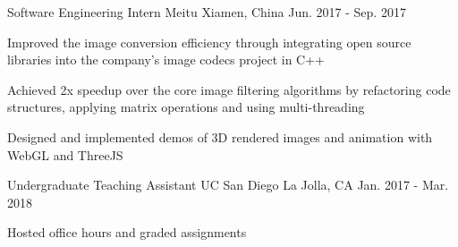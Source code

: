 \begin{cventries}
  \cventry
    {Software Engineering Intern} %
    {Meitu} %
    {Xiamen, China} %
    {Jun. 2017 - Sep. 2017} %
    {
      \begin{cvitems} %
        \item {Improved the image conversion efficiency through integrating open source libraries into the company's image codecs project in C++}
        \item {Achieved 2x speedup over the core image filtering algorithms by refactoring code structures, applying matrix operations and using multi-threading}
        \item {Designed and implemented demos of 3D rendered images and animation with WebGL and ThreeJS}
      \end{cvitems}
    }


  \cventry
    {Undergraduate Teaching Assistant} %
    {UC San Diego} %
    {La Jolla, CA} %
    {Jan. 2017 - Mar. 2018} %
    {
      \begin{cvitems} %
        \item {Hosted office hours and graded assignments}
      \end{cvitems}
    }


\end{cventries}
